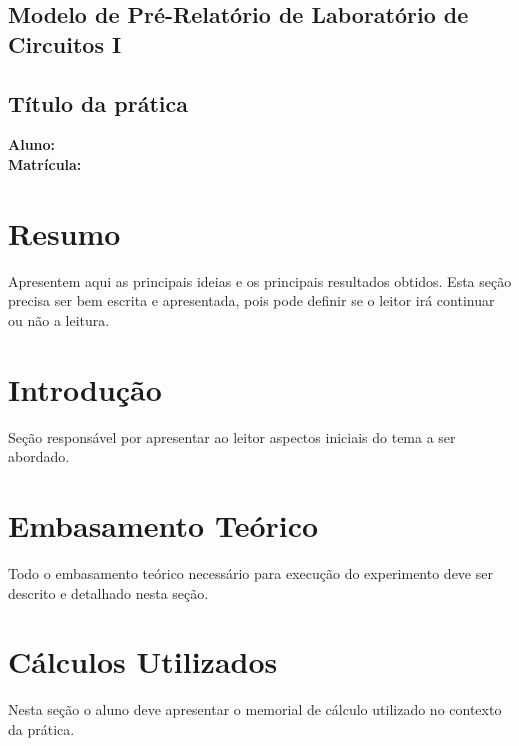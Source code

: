 \documentclass[12pt,a4paper]{article}
\begin{document}
\vspace{1cm}

\begin{center}
\section*{Modelo de Pré-Relatório de Laboratório de Circuitos I} 

\subsection*{Título da prática}

\end{center}

\begin{flushleft}

\textbf{Aluno:} \\

\textbf{Matrícula: }


\end{flushleft}

\section*{Resumo}

Apresentem aqui as principais ideias e os principais resultados obtidos. Esta seção precisa ser bem escrita e apresentada, pois pode definir se o leitor irá continuar ou não a leitura.

\section{Introdução}

Seção responsável por apresentar ao leitor aspectos iniciais do tema a ser abordado. 

\section{Embasamento Teórico}

Todo o embasamento teórico necessário para execução do experimento deve ser descrito e detalhado nesta seção.

\section{Cálculos Utilizados}

Nesta seção o aluno deve apresentar o memorial de cálculo utilizado no contexto da prática.
\end{document}
